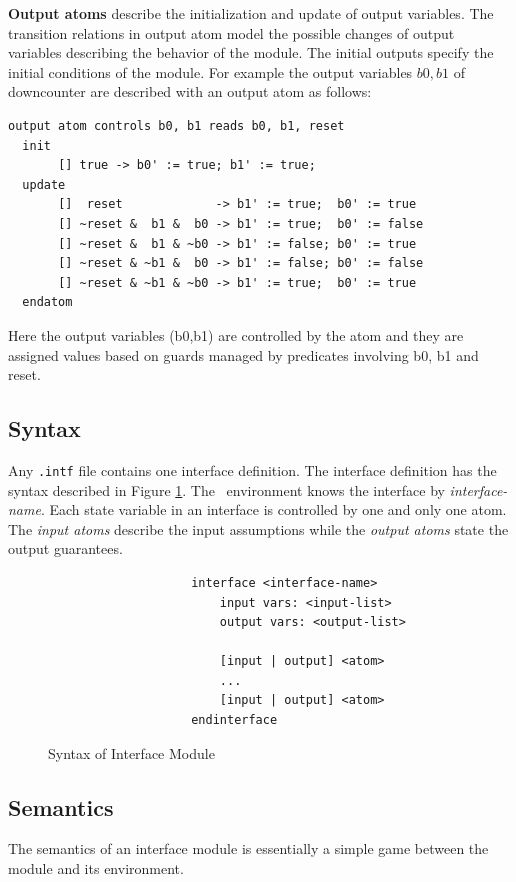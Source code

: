 \textbf{Output atoms }describe the initialization and update of
output variables. The transition relations in output atom model
the possible changes of output variables describing the behavior
of the module. The initial outputs specify the initial conditions
of the module. For example the output variables $b0,b1$ of
downcounter are described with an output atom as follows:
\begin{verbatim}
output atom controls b0, b1 reads b0, b1, reset
  init
       [] true -> b0' := true; b1' := true;
  update
       []  reset             -> b1' := true;  b0' := true
       [] ~reset &  b1 &  b0 -> b1' := true;  b0' := false
       [] ~reset &  b1 & ~b0 -> b1' := false; b0' := true
       [] ~reset & ~b1 &  b0 -> b1' := false; b0' := false
       [] ~reset & ~b1 & ~b0 -> b1' := true;  b0' := true
  endatom
\end{verbatim}
Here the output variables (b0,b1) are controlled by the atom and
they are assigned values based on guards managed by predicates
involving b0, b1 and reset.

\subsection{Syntax}
Any {\tt .intf} file contains one interface definition. The
interface definition has the syntax described in Figure
\ref{fig:interfacesyntax}. The \chai \ environment knows the
interface by \emph{interface-name}. Each state variable in an
interface is controlled by one and only one atom. The \emph{input
atoms} describe the input assumptions while the \emph{output
atoms} state the output guarantees.

\begin{figure}
\centering
\begin{verbatim}
                    interface <interface-name>
                        input vars: <input-list>
                        output vars: <output-list>

                        [input | output] <atom>
                        ...
                        [input | output] <atom>
                    endinterface
\end{verbatim}
\caption{Syntax of Interface Module} \label{fig:interfacesyntax}
\end{figure}

\subsection{Semantics}
The semantics of an interface module is essentially a simple game
between the module and its environment.

